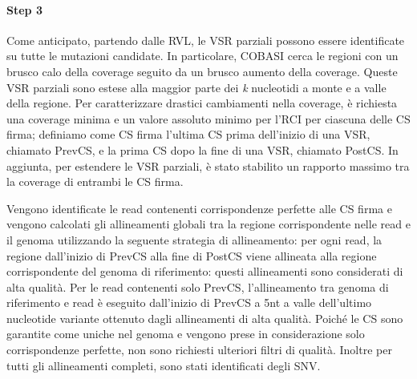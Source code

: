 \documentclass[../main.tex]{subfiles}
\begin{document}
\paragraph{Step 3} Come anticipato, partendo dalle RVL, le VSR parziali possono essere identificate su tutte le mutazioni candidate. In particolare, COBASI cerca le regioni con un brusco calo della coverage seguito da un brusco aumento della coverage. Queste VSR parziali sono estese alla maggior parte dei \textit{k} nucleotidi a monte e a valle della regione. Per caratterizzare drastici cambiamenti nella coverage, è richiesta una coverage minima e un valore assoluto minimo per l'RCI per ciascuna delle CS firma; definiamo come CS firma l'ultima CS prima dell'inizio di una VSR, chiamato PrevCS, e la prima CS dopo la fine di una VSR, chiamato  PostCS. In aggiunta, per estendere le VSR parziali, è stato stabilito un rapporto massimo tra la coverage di entrambi le CS firma. 

Vengono identificate le read contenenti corrispondenze perfette alle CS firma e vengono calcolati gli allineamenti globali tra la regione corrispondente nelle read e il genoma utilizzando la seguente strategia di allineamento: per ogni read, la regione dall'inizio di PrevCS alla fine di PostCS viene allineata alla regione corrispondente del genoma di riferimento: questi allineamenti sono considerati di alta qualità. Per le read contenenti solo PrevCS, l'allineamento tra genoma di riferimento e read è eseguito dall'inizio di PrevCS a 5nt a valle dell'ultimo nucleotide variante ottenuto dagli allineamenti di alta qualità. Poiché le CS sono garantite come uniche nel genoma e vengono prese in considerazione solo corrispondenze perfette, non sono richiesti ulteriori filtri di qualità. Inoltre per tutti gli allineamenti completi, sono stati identificati degli SNV.
\end{document}

